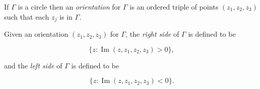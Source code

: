 If $\Gamma$ is a circle then an \textit{orientation} for $\Gamma$ is an ordered triple of points $(z_1, z_2, z_3)$ such that each $z_j$ is in $\Gamma$.

Given an orientation $(z_1, z_2, z_3)$ for $\Gamma$, the \textit{right side} of $\Gamma$ is defined to be

$$\{z : \operatorname{Im} (z, z_1, z_2, z_3) > 0\},$$

and the \textit{left side} of $\Gamma$ is defined to be

$$\{z : \operatorname{Im} (z, z_1, z_2, z_3) < 0\}.$$
